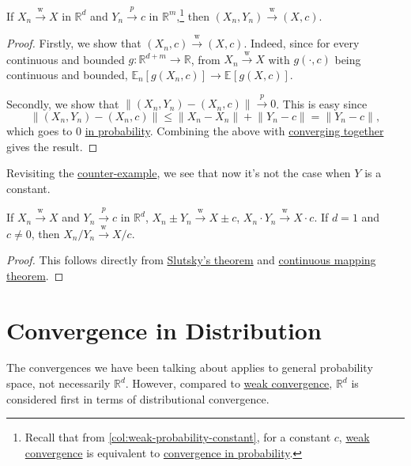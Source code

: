 \begin{theorem}\label{thm:Slutsky}
	If \(X_n \overset{\text{w} }{\to } X \) in \(\mathbb{R} ^d\) and \(Y_n \overset{p}{\to } c\) in \(\mathbb{R} ^m\),\footnote{Recall that from \autoref{col:weak-probability-constant}, for a constant \(c\), \hyperref[def:converge-weakly]{weak convergence} is equivalent to \hyperref[def:converge-in-probability]{convergence in probability}.} then \((X_n , Y_n) \overset{\text{w} }{\to } (X, c)\).
\end{theorem}
\begin{proof}
	Firstly, we show that \((X_n , c) \overset{\text{w} }{\to } (X, c)\). Indeed, since for every continuous and bounded \(g \colon \mathbb{R} ^{d+m} \to \mathbb{R} \), from \(X_n \overset{\text{w} }{\to } X\) with \(g(\cdot, c)\) being continuous and bounded, \(\mathbb{E}_{n}\left[g(X_n, c) \right] \to \mathbb{E}_{}\left[g(X, c) \right]\).

	Secondly, we show that \(\lVert (X_n, Y_n) - (X_n, c) \rVert \overset{p}{\to } 0\). This is easy since
	\[
		\lVert (X_n, Y_n) - (X_n, c) \rVert
		\leq \lVert X_n - X_n \rVert + \lVert Y_n - c \rVert
		= \lVert Y_n - c \rVert ,
	\]
	which goes to \(0\) \hyperref[def:converge-in-probability]{in probability}. Combining the above with \hyperref[thm:converging-together]{converging together} gives the result.
\end{proof}

Revisiting the \hyperref[eg:counter-example-continuous-mapping]{counter-example}, we see that now it's not the case when \(Y\) is a constant.

\begin{corollary}\label{col:Slutsky}
	If \(X_n \overset{\text{w} }{\to } X \) and \(Y_n \overset{p}{\to } c\) in \(\mathbb{R} ^d\), \(X_n \pm Y_n \overset{\text{w} }{\to } X \pm c\), \(X_n \cdot Y_n \overset{\text{w} }{\to } X \cdot c\). If \(d = 1\) and \(c \neq 0\), then \(X_n / Y_n \overset{\text{w} }{\to } X / c\).
\end{corollary}
\begin{proof}
	This follows directly from \hyperref[thm:Slutsky]{Slutsky's theorem} and \hyperref[thm:continuous-mapping]{continuous mapping theorem}.
\end{proof}

\section{Convergence in Distribution}
The convergences we have been talking about applies to general probability space, not necessarily \(\mathbb{R} ^d\). However, compared to \hyperref[def:converge-weakly]{weak convergence}, \(\mathbb{R} ^d\) is considered first in terms of distributional convergence.

